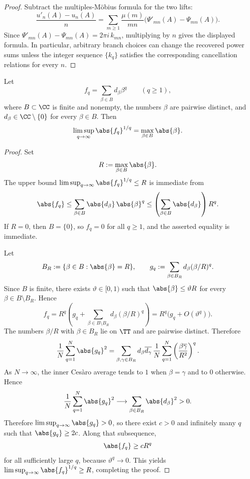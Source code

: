 \begin{proof}
  Subtract the multiples-M\"obius formula for the two lifts:
  \[
    \frac{u'_n(A)-u_n(A)}{n}
    =
    \sum_{m\ge1}\frac{\mu(m)}{mn}
      \bigl(\Psi'_{mn}(A)-\Psi_{mn}(A)\bigr).
  \]
  Since \(\Psi'_{mn}(A)-\Psi_{mn}(A)=2\pi i\,k_{mn}\), multiplying by
  \(n\) gives the displayed formula. In particular, arbitrary branch
  choices can change the recovered power sums unless the integer
  sequence \(\{k_q\}\) satisfies the corresponding cancellation
  relations for every \(n\).
\end{proof}

\begin{lemma}
  \label{lem:finite-part-exponential-sum-limsup}
  Let
  \[
    f_q=\sum_{\beta\in B} d_\beta \beta^q
    \qquad (q\ge 1),
  \]
  where \(B\subset\CC\) is finite and nonempty, the numbers \(\beta\) are
  pairwise distinct, and \(d_\beta\in\CC\setminus\{0\}\) for every
  \(\beta\in B\).
  Then
  \[
    \limsup_{q\to\infty}\abs{f_q}^{1/q}
    =\max_{\beta\in B}\abs{\beta}.
  \]
\end{lemma}

\begin{proof}
  Set
  \[
    R:=\max_{\beta\in B}\abs{\beta}.
  \]
  The upper bound
  \(\limsup_{q\to\infty}\abs{f_q}^{1/q}\le R\) is immediate from
  \[
    \abs{f_q}
    \le \sum_{\beta\in B}\abs{d_\beta}\,\abs{\beta}^q
    \le \left(\sum_{\beta\in B}\abs{d_\beta}\right)R^q.
  \]
  If \(R=0\), then \(B=\{0\}\), so \(f_q=0\) for all \(q\ge 1\), and the
  asserted equality is immediate.

  Let
  \[
    B_R:=\{\beta\in B:\abs{\beta}=R\},
    \qquad
    g_q:=\sum_{\beta\in B_R} d_\beta (\beta/R)^q.
  \]
  Since \(B\) is finite, there exists \(\vartheta\in[0,1)\) such that
  \(\abs{\beta}\le \vartheta R\) for every \(\beta\in B\setminus B_R\).
  Hence
  \[
    f_q
    =
    R^q\left(g_q+\sum_{\beta\in B\setminus B_R}d_\beta(\beta/R)^q\right)
    =
    R^q\bigl(g_q+O(\vartheta^q)\bigr).
  \]
  The numbers \(\beta/R\) with \(\beta\in B_R\) lie on \(\TT\) and are
  pairwise distinct. Therefore
  \[
    \frac{1}{N}\sum_{q=1}^N\abs{g_q}^2
    =
    \sum_{\beta,\gamma\in B_R}
      d_\beta\overline{d_\gamma}\,
      \frac{1}{N}\sum_{q=1}^N
        \left(\frac{\beta\overline{\gamma}}{R^2}\right)^q.
  \]
  As \(N\to\infty\), the inner Ces\`aro average tends to \(1\) when
  \(\beta=\gamma\) and to \(0\) otherwise. Hence
  \[
    \frac{1}{N}\sum_{q=1}^N\abs{g_q}^2
    \longrightarrow
    \sum_{\beta\in B_R}\abs{d_\beta}^2>0.
  \]
  Therefore \(\limsup_{q\to\infty}\abs{g_q}>0\), so there exist
  \(c>0\) and infinitely many \(q\) such that \(\abs{g_q}\ge 2c\). Along
  that subsequence,
  \[
    \abs{f_q}\ge cR^q
  \]
  for all sufficiently large \(q\), because \(\vartheta^q\to 0\). This
  yields
  \(\limsup_{q\to\infty}\abs{f_q}^{1/q}\ge R\), completing the proof.
\end{proof}

